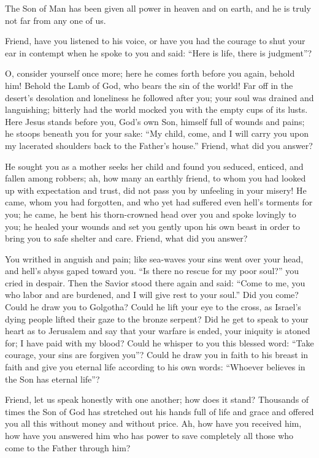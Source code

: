 The Son of Man has been given all power in heaven and on earth, and he is truly not far from any one of us.

Friend, have you listened to his voice, or have you had the courage to shut your ear in contempt when he spoke to you and said: “Here is life, there is judgment”?

O, consider yourself once more; here he comes forth before you again, behold him! Behold the Lamb of God, who bears the sin of the world! Far off in the desert’s desolation and loneliness he followed after you; your soul was drained and languishing; bitterly had the world mocked you with the empty cups of its lusts. Here Jesus stands before you, God’s own Son, himself full of wounds and pains; he stoops beneath you for your sake: “My child, come, and I will carry you upon my lacerated shoulders back to the Father’s house.” Friend, what did you answer?

He sought you as a mother seeks her child and found you seduced, enticed, and fallen among robbers; ah, how many an earthly friend, to whom you had looked up with expectation and trust, did not pass you by unfeeling in your misery! He came, whom you had forgotten, and who yet had suffered even hell’s torments for you; he came, he bent his thorn-crowned head over you and spoke lovingly to you; he healed your wounds and set you gently upon his own beast in order to bring you to safe shelter and care. Friend, what did you answer?

You writhed in anguish and pain; like sea-waves your sins went over your head, and hell’s abyss gaped toward you. “Is there no rescue for my poor soul?” you cried in despair. Then the Savior stood there again and said: “Come to me, you who labor and are burdened, and I will give rest to your soul.” Did you come? Could he draw you to Golgotha? Could he lift your eye to the cross, as Israel’s dying people lifted their gaze to the bronze serpent? Did he get to speak to your heart as to Jerusalem and say that your warfare is ended, your iniquity is atoned for; I have paid with my blood? Could he whisper to you this blessed word: “Take courage, your sins are forgiven you”? Could he draw you in faith to his breast in faith and give you eternal life according to his own words: “Whoever believes in the Son has eternal life”?

Friend, let us speak honestly with one another; how does it stand? Thousands of times the Son of God has stretched out his hands full of life and grace and offered you all this without money and without price. Ah, how have you received him, how have you answered him who has power to save completely all those who come to the Father through him?

